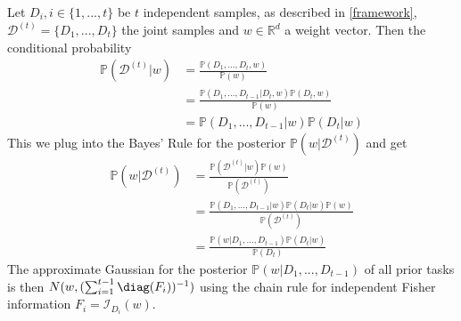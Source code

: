 Let $D_i, i \in \{1, ...,t\}$ be $t$ independent samples, as described in \autoref{framework}, $\mathcal{D}^{(t)} = \{D_1, ..., D_t\}$ the joint samples and $w \in \mathbb{R}^d$ a weight vector. Then the conditional probability 
\begin{equation}
	\begin{split}
		\mathbb{P}(\mathcal{D}^{(t)}|w) & = \frac{\mathbb{P}(D_1, ..., D_t, w)}{\mathbb{P}(w)} \\
		& = \frac{\mathbb{P}(D_1, ...,D_{t-1}|D_t, w) \mathbb{P}(D_t, w)}{\mathbb{P}(w)} \\
		& = \mathbb{P}(D_1, ...,D_{t-1}|w) \mathbb{P}(D_t|w)
	\end{split}
\end{equation}
This we plug into the Bayes' Rule for the posterior $\mathbb{P}(w|\mathcal{D}^{(t)})$ and get 
\begin{equation}
	\begin{split}
		\mathbb{P}(w|\mathcal{D}^{(t)}) & = \frac{\mathbb{P}(\mathcal{D}^{(t)}|w) \mathbb{P}(w)}{\mathbb{P}(\mathcal{D}^{(t)})} \\
		& = \frac{\mathbb{P}(D_1, ...,D_{t-1}|w) \mathbb{P}(D_t|w) \mathbb{P}(w)}{\mathbb{P}(\mathcal{D}^{(t)})} \\
		& = \frac{\mathbb{P}(w|D_1, ...,D_{t-1}) \mathbb{P}(D_t|w)}{\mathbb{P}(D_t)}
	\end{split}
\end{equation}
The approximate Gaussian for the posterior $\mathbb{P}(w|D_1, ...,D_{t-1})$ of all prior tasks is then $N(w, (\sum_{i=1}^{t-1}\diag(F_i))^{-1})$ using the chain rule for independent Fisher information $F_i = \mathcal{I}_{D_i}(w)$.